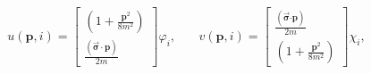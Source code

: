 \begin{equation}
u(\mathbf{p,}i)=\left[ 
\begin{array}{c}
\left( 1+\frac{\mathbf{p}^{2}}{8m^{2}}\right)  \\ 
\frac{(\overrightarrow{\mathbf{\sigma }}\cdot \mathbf{p})}{2m}
\end{array}
\right] \varphi _{i},\;\ \ \ \ \ \ \ v(\mathbf{p,}i)=\left[ 
\begin{array}{c}
\frac{(\overrightarrow{\mathbf{\sigma }}\mathbf{\cdot p})}{2m} \\ 
\left( 1+\frac{\mathbf{p}^{2}}{8m^{2}}\right) 
\end{array}
\right] \chi _{i},
\end{equation}


